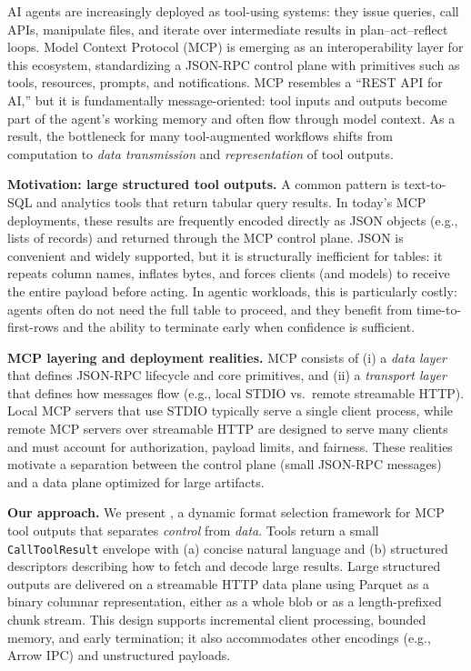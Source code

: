 \label{sec:intro}

AI agents are increasingly deployed as tool-using systems: they issue queries, call APIs, manipulate files, and iterate over intermediate results in plan--act--reflect loops. Model Context Protocol (MCP) is emerging as an interoperability layer for this ecosystem, standardizing a JSON-RPC control plane with primitives such as tools, resources, prompts, and notifications. MCP resembles a ``REST API for AI,'' but it is fundamentally message-oriented: tool inputs and outputs become part of the agent’s working memory and often flow through model context. As a result, the bottleneck for many tool-augmented workflows shifts from computation to \emph{data transmission} and \emph{representation} of tool outputs.

\smallskip
\noindent\textbf{Motivation: large structured tool outputs.}
A common pattern is text-to-SQL and analytics tools that return tabular query results. In today’s MCP deployments, these results are frequently encoded directly as JSON objects (e.g., lists of records) and returned through the MCP control plane. JSON is convenient and widely supported, but it is structurally inefficient for tables: it repeats column names, inflates bytes, and forces clients (and models) to receive the entire payload before acting. In agentic workloads, this is particularly costly: agents often do not need the full table to proceed, and they benefit from time-to-first-rows and the ability to terminate early when confidence is sufficient.

\smallskip
\noindent\textbf{MCP layering and deployment realities.}
MCP consists of (i) a \emph{data layer} that defines JSON-RPC lifecycle and core primitives, and (ii) a \emph{transport layer} that defines how messages flow (e.g., local STDIO vs.\ remote streamable HTTP). Local MCP servers that use STDIO typically serve a single client process, while remote MCP servers over streamable HTTP are designed to serve many clients and must account for authorization, payload limits, and fairness. These realities motivate a separation between the control plane (small JSON-RPC messages) and a data plane optimized for large artifacts.

\smallskip
\noindent\textbf{Our approach.}
We present \system, a dynamic format selection framework for MCP tool outputs that separates \emph{control} from \emph{data}. Tools return a small \texttt{CallToolResult} envelope with (a) concise natural language and (b) structured descriptors describing how to fetch and decode large results. Large structured outputs are delivered on a streamable HTTP data plane using Parquet as a binary columnar representation, either as a whole blob or as a length-prefixed chunk stream. This design supports incremental client processing, bounded memory, and early termination; it also accommodates other encodings (e.g., Arrow IPC) and unstructured payloads.

